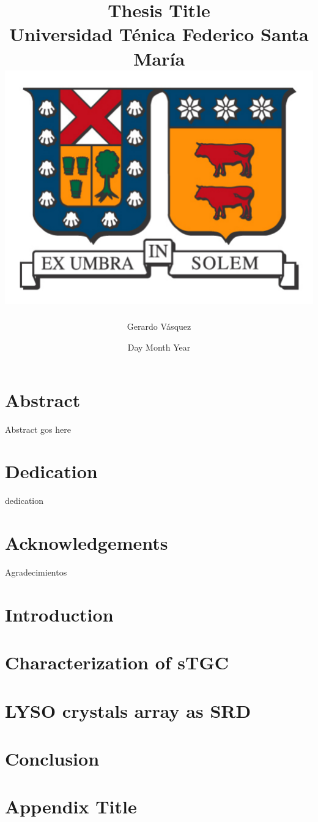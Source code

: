 \documentclass[12pt, a4letter,twoside,openright]{book}
\title{
				{Thesis Title}\\
				{\large Universidad Ténica Federico Santa María}\\
				{\includegraphics{logo2.pdf}}
}
\author{Gerardo Vásquez}
\date{Day Month Year}
\begin{document}
\maketitle


\chapter*{Abstract}
Abstract gos here
\chapter*{Dedication}
dedication
\chapter*{Acknowledgements}
Agradecimientos
\tableofcontents

\chapter{Introduction}


\chapter{Characterization of sTGC}


\chapter{LYSO crystals array as SRD}



\chapter{Conclusion}

\appendix
\chapter{Appendix Title}

\end{document}
